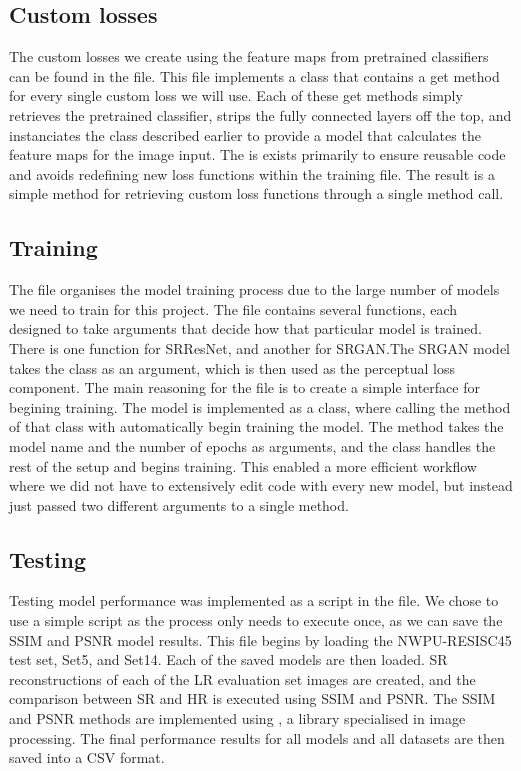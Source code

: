 \subsection{Custom losses}
The custom losses we create using the feature maps from pretrained classifiers can be found in the  file. This file implements a class that contains a get method for every single custom loss we will use. Each of these get methods simply retrieves the pretrained classifier, strips the fully connected layers off the top, and instanciates the  class described earlier to provide a model that calculates the feature maps for the image input. The  is exists primarily to ensure reusable code and avoids redefining new loss functions within the training file. The result is a simple method for retrieving custom loss functions through a single method call.

\subsection{Training}
The  file organises the model training process due to the large number of models we need to train for this project. The file contains several functions, each designed to take arguments that decide how that particular model is trained. There is one function for SRResNet, and another for SRGAN.\@ The SRGAN model takes the  class as an argument, which is then used as the perceptual loss component. The main reasoning for the  file is to create a simple interface for begining training. The model is implemented as a class, where calling the  method of that class with automatically begin training the model. The  method takes the model name and the number of epochs as arguments, and the class handles the rest of the setup and begins training. This enabled a more efficient workflow where we did not have to extensively edit code with every new model, but instead just passed two different arguments to a single method.

\subsection{Testing}
Testing model performance was implemented as a script in the  file. We chose to use a simple script as the process only needs to execute once, as we can save the SSIM and PSNR model results. This file begins by loading the NWPU-RESISC45 test set, Set5, and Set14. Each of the saved models are then loaded. SR reconstructions of each of the LR evaluation set images are created, and the comparison between SR and HR is executed using SSIM and PSNR. The SSIM and PSNR methods are implemented using , a  library specialised in image processing. The final performance results for all models and all datasets are then saved into a CSV format.

